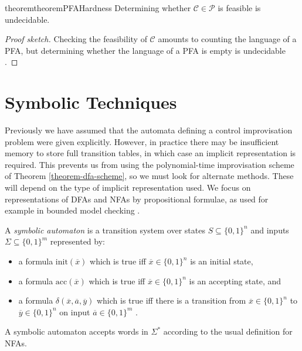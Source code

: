 \documentclass[a4paper,USenglish,numberwithinsect]{lipics}
\theoremstyle{plain}
\theoremstyle{definition}
\begin{document}
\begin{restatable}{theorem}{theoremPFAHardness} \label{theorem:pfa-hardness}
Determining whether $\mathcal{C} \in \mathcal{P}$ is feasible is undecidable.
\end{restatable}
\begin{proof}[Proof sketch]
Checking the feasibility of $\mathcal{C}$ amounts to counting the language of a PFA, but determining whether the language of a PFA is empty is undecidable \cite{nasu-honda,condon-lipton}.
\end{proof}

\section{Symbolic Techniques} \label{section:symbolic}

Previously we have assumed that the automata defining a control
improvisation problem were given explicitly. However, in practice
there may be insufficient memory to store full transition tables, in
which case an implicit representation is required. This prevents us from using
the polynomial-time improvisation scheme of Theorem
\ref{theorem-dfa-scheme}, so we must look for alternate methods. These
will depend on the type of implicit representation used. We focus on
representations of DFAs and NFAs by propositional formulae, as used
for example in bounded model checking \cite{bmc}. 
\begin{definition}
A \emph{symbolic automaton} is a transition system over states $S \subseteq \{0,1\}^n$ and inputs $\Sigma \subseteq \{0,1\}^m$ represented by:
\begin{itemize}
\item a formula $\mathrm{init}(\overline{x})$ which is true iff $\overline{x} \in \{0,1\}^n$ is an initial state,
\item a formula $\mathrm{acc}(\overline{x})$ which is true iff $\overline{x} \in \{0,1\}^n$ is an accepting state, and
\item a formula $\delta(\overline{x}, \overline{a}, \overline{y})$ which is true iff there is a transition from $\overline{x} \in \{0,1\}^n$ to $\overline{y} \in \{0,1\}^n$ on input $\overline{a} \in \{0,1\}^m$ .
\end{itemize}
A symbolic automaton accepts words in $\Sigma^*$ according to the usual definition for NFAs.
\end{definition}
\end{document}
